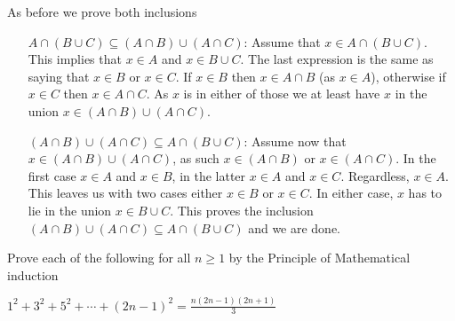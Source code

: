 \documentclass[a4paper, english, 12pt]{article} %
\newcommand{\solutions}{true} %
\begin{document}
\begin{answer}
  As before we prove both inclusions
  \begin{enumerate}[align=left]
    \item[$A \cap (B \cup C) \subseteq (A \cap B) \cup (A \cap C)$:] Assume that
      $x \in A \cap (B \cup C)$. This implies that $x \in A$ and $x \in B \cup
      C$. The last expression is the same as saying that $x \in B$ or $x \in C$.
      If $x \in B$ then $x \in A \cap B$ (as $x \in A$), otherwise if $x \in C$ then $x \in A
      \cap C$. As $x$ is in either of those we at least have $x$ in the union $x
      \in (A \cap B) \cup (A \cap C)$.
    \item[$(A \cap B) \cup (A \cap C) \subseteq A \cap (B \cup C)$:]
      Assume now that $x \in (A \cap B) \cup (A \cap C)$, as such $x \in (A \cap
      B)$ or $x \in (A \cap C)$. In the first case $x \in A$ and $x \in B$, in
      the latter $x \in A$ and $x \in C$. Regardless, $x \in A$. This leaves us
      with two cases either $x \in B$ or $x \in C$. In either case, $x$ has to
      lie in the union $x \in B \cup C$. This proves the inclusion
      $(A \cap B) \cup (A \cap C) \subseteq A \cap (B \cup C)$ and we are
      done.  
  \end{enumerate} 
\end{answer}

\ifthenelse{\boolean{\solutions}}{\newpage}{}



\begin{problem}
  Prove each of the following for all $n \geq 1$ by the Principle of
  Mathematical induction
\end{problem}

\begin{subproblem}
  $\displaystyle 1^2 + 3^2 + 5^2 + \cdots + (2n-1)^2 = \frac{n(2n-1)(2n+1)}{3}$
\end{subproblem}
\end{document}
